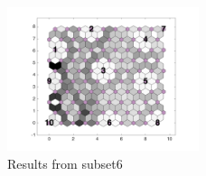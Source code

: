 \begin{figure}
        \centering
        \includegraphics[width=0.5\textwidth]{../../images0.01/M31/2D/image_subsets/subset6_dist_with_hits_t.png}
    \caption{Results from subset6}
    \label{fig: subset6}
\end{figure}